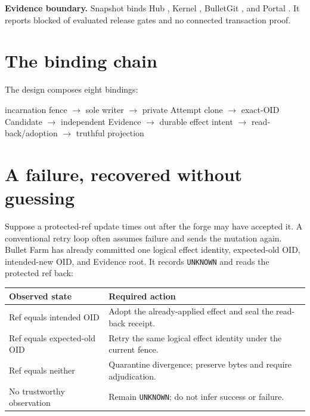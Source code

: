 \documentclass[11pt,letterpaper]{article}
\begin{document}
\vfill
{\small\textbf{Evidence boundary.} Snapshot \EvidenceSnapshotId{} binds Hub
\EvidenceHubCommit, Kernel \EvidenceKernelCommit, BulletGit
\EvidenceGitCommit, and Portal \EvidencePortalCommit. It reports
\EvidenceReleaseBlocked{} blocked of \EvidenceReleaseEvaluated{} evaluated
release gates and no connected transaction proof.}

\newpage
\section*{The binding chain}

\begin{center}
\resizebox{.99\textwidth}{!}{\BulletArchitectureFigure{\textwidth}}
\end{center}

The design composes eight bindings:

\begin{center}
\small incarnation fence $\rightarrow$ sole writer $\rightarrow$ private Attempt clone
$\rightarrow$ exact-OID Candidate $\rightarrow$ independent Evidence
$\rightarrow$ durable effect intent $\rightarrow$ read-back/adoption
$\rightarrow$ truthful projection
\end{center}

\section*{A failure, recovered without guessing}

Suppose a protected-ref update times out after the forge may have accepted it.
A conventional retry loop often assumes failure and sends the mutation again.
Bullet Farm has already committed one logical effect identity, expected-old
OID, intended-new OID, and Evidence root. It records \texttt{UNKNOWN} and reads
the protected ref back:

\begin{tabularx}{\textwidth}{@{}p{}X@{}}
\toprule
Observed state & Required action \\
\midrule
Ref equals intended OID & Adopt the already-applied effect and seal the read-back receipt. \\
Ref equals expected-old OID & Retry the same logical effect identity under the current fence. \\
Ref equals neither & Quarantine divergence; preserve bytes and require adjudication. \\
No trustworthy observation & Remain \texttt{UNKNOWN}; do not infer success or failure. \\
\bottomrule
\end{tabularx}
\end{document}
